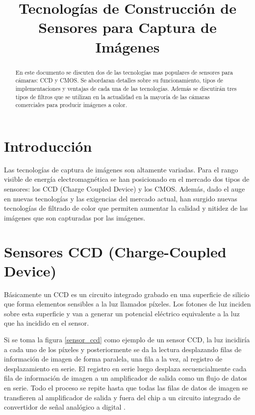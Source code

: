 \documentclass[conference]{IEEEtran}
\begin{document}
\title{Tecnologías de Construcción de Sensores para Captura de Imágenes}

\author{
}


\maketitle
\thispagestyle{plain}
\pagestyle{plain}

\begin{abstract}
En este documento se discuten dos de las tecnologías mas populares de sensores para cámaras: CCD y CMOS. Se abordaran detalles sobre su funcionamiento, tipos de implementaciones y ventajas de cada una de las tecnologías. Además se discutirán tres tipos de filtros que se utilizan en la actualidad en la mayoría de las cámaras comerciales para producir imágenes a color.
\end{abstract}


\section{\textbf{Introducci\'on}}
Las tecnolog\'ias de captura de im\'agenes son altamente variadas. Para el rango visible de energ\'ia electromagn\'etica se han posicionado en el mercado dos tipos de sensores: los CCD (Charge Coupled Device) y los CMOS. Además, dado el auge en nuevas tecnologías y las exigencias del mercado actual, han surgido nuevas tecnologías de filtrado de color que permiten aumentar la calidad y nitidez de las imágenes que son capturadas por las imágenes.

\section{\textbf{Sensores CCD (Charge-Coupled Device)}}
Básicamente un CCD es un circuito integrado grabado en una superficie de silicio que forma elementos sensibles a la luz llamados píxeles. Los fotones de luz inciden sobre esta superficie y van a generar un potencial eléctrico equivalente a la luz que ha incidido en el sensor.

Si se toma la figura \ref{sensor_ccd} como ejemplo de un sensor CCD, la luz incidiría a cada uno de los píxeles y posteriormente se da la lectura desplazando filas de información de imagen de forma paralela, una fila a la vez, al registro de desplazamiento en serie. El registro en serie luego desplaza secuencialmente cada fila de información de imagen a un amplificador de salida como un flujo de datos en serie. Todo el proceso se repite hasta que todas las filas de datos de imagen se transfieren al amplificador de salida y fuera del chip a un circuito integrado de convertidor de señal analógico a digital \cite{ccd_sensor1}.
\end{document}
